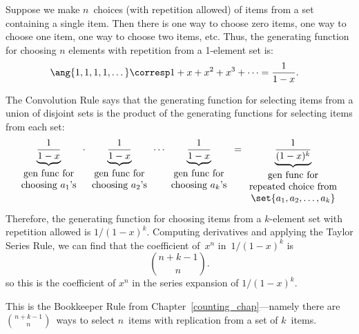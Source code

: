 Suppose we make $n$~choices (with repetition allowed) of items from a set
containing a single item.  Then there is one way to choose zero items, one
way to choose one item, one way to choose two items, etc.  Thus, the
generating function for choosing $n$ elements with repetition from a
1-element set is:
%
\begin{align*}
\ang{1, 1, 1, 1, \dots}
     & \corresp  1 + x + x^2 + x^3 + \cdots %
 =  \frac{1}{1-x}.
\end{align*}

The Convolution Rule says that the generating function for selecting
items from a union of disjoint sets is the product of the generating
functions for selecting items from each set:
%
\[
\underbrace{\frac{1}{1-x}}_{
\begin{array}{cc}
\mbox{gen func for} \\
\text{choosing $a_1$'s}
\end{array}}
\cdot
\underbrace{\frac{1}{1-x}}_{
\begin{array}{cc}
\mbox{gen func for} \\
\text{choosing $a_2$'s}
\end{array}}
\cdots
\underbrace{\frac{1}{1-x}}_{
\begin{array}{cc}
\mbox{gen func for} \\
\text{choosing $a_k$'s}
\end{array}}
=
\underbrace{\frac{1}{(1-x)^k}}_{
\begin{array}{cc}
\mbox{gen func for} \\
\text{repeated choice from} \\
\set{a_1, a_2, \dots, a_k}
\end{array}}
\]
%
Therefore, the generating function for choosing items from a
$k$-element set with repetition allowed is $1 / (1 - x)^k$.  Computing
derivatives and applying the Taylor Series Rule, we can find that the
coefficient of~$x^n$ in~$1 / (1 - x)^k$ is
\[
    \binom{n+k-1}{n}.
\]
so this is the coefficient of $x^n$ in the series expansion of $1 / (1 -
x)^k$.

This is the Bookkeeper Rule from Chapter~\ref{counting_chap}---namely
there are $\binom{n + k - 1}{n}$~ways to select $n$~items with
replication from a set of $k$~items.


\begin{problems}
\practiceproblems
{}

\classproblems
{}

\homeworkproblems
{}

\examproblems
{}

\end{problems}

